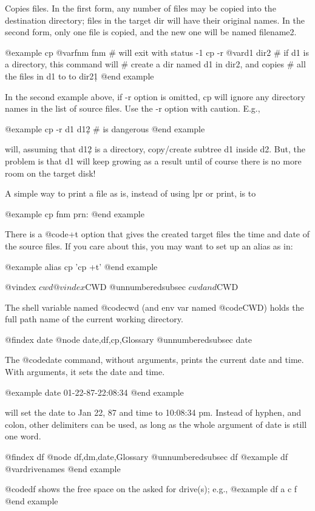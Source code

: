 {Copies files.  In the first form, any number of files may be copied into
the destination directory; files in the target dir will have their original
names.  In the second form, only one file is copied, and the new one will
be named filename2.

@example
cp @var{fnm fnm}    # will exit with status -1 
cp -r @var{d1 dir2}     # if d1 is a directory, this command will
              # create a dir named d1 in dir2, and copies
              # all the files in d1 to to dir2\d1 
@end example

In the second example above, if -r option is omitted, cp will ignore any
directory names in the list of source files.  Use the -r option with
caution.  E.g.,

@example
cp -r d1  d1\d2 # is dangerous 
@end example

will, assuming that d1\d2 is a directory, copy/create subtree d1 inside d2.
But, the problem is that d1 will keep growing as a result until of course
there is no more room on the target disk!

A simple way to print a file as is, instead of using lpr or print, is to

@example
cp fnm prn: 
@end example

There is a @code{+t} option that gives the created target files the time
and date of the source files.  If you care about this, you may want to set
up an alias as in:

@example
alias cp 'cp +t' 
@end example

@vindex $cwd
@vindex $CWD
@unnumberedsubsec $cwd and $CWD

The shell variable named @code{cwd} (and env var named @code{CWD}) holds the
full path name of the current working directory.  

@findex date
@node date,df,cp,Glossary
@unnumberedsubsec date

The @code{date} command, without arguments, prints the current date and
time.  With arguments, it sets the date and time.  

@example
date 01-22-87-22:08:34 
@end example

will set the date to Jan 22, 87 and time to 10:08:34 pm.  Instead of hyphen,
and colon, other delimiters can be used, as long as the whole argument of date
is still one word.

@findex df
@node df,dm,date,Glossary
@unnumberedsubsec df
@example
df @var{drivenames}
@end example

@code{df}  shows the free space on the asked for drive(s); e.g.,
@example
df a c f
@end example

}
